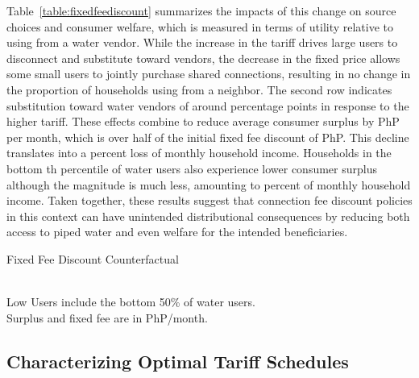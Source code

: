 \documentclass[12pt]{article}
\begin{document}
Table~\ref{table:fixedfeediscount} summarizes the impacts of this change on source choices and consumer welfare, which is measured in terms of utility relative to using from a water vendor.  While the increase in the tariff drives large users to disconnect and substitute toward vendors, the decrease in the fixed price allows some small users to jointly purchase shared connections, resulting in no change in the proportion of households using from a neighbor.  The second row indicates substitution toward water vendors of around percentage points in response to the higher tariff.  These effects combine to reduce average consumer surplus by PhP per month, which is over half of the initial fixed fee discount of PhP.  This decline translates into a percent loss of monthly household income.  Households in the bottom \unskip th percentile of water users also experience lower consumer surplus although the magnitude is much less, amounting to percent of monthly household income.  Taken together, these results suggest that connection fee discount policies in this context can have unintended distributional consequences by reducing both access to piped water and even welfare for the intended beneficiaries. %
\begin{table}
	\centering
	\caption{Fixed Fee Discount Counterfactual}\label{table:fixedfeediscount}
	 \\
	\vspace{.2cm}
	\footnotesize{Low Users include the bottom 50\% of water users. \\
	Surplus and fixed fee are in PhP/month.}
\end{table}

\subsection{Characterizing Optimal Tariff Schedules}
\end{document}
